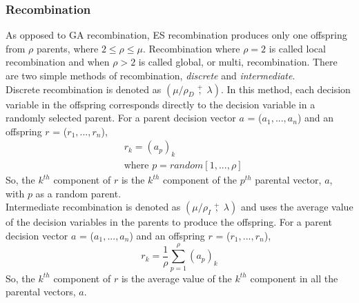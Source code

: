 \subsubsection{Recombination}
As opposed to GA recombination, ES recombination produces only one offspring from $\rho$ parents, where $2 \le \rho \le \mu$. Recombination where $\rho = 2$ is called local recombination and when $\rho > 2$ is called global\cite{4-es}, or multi\cite{es}, recombination. There are two simple methods of recombination, \emph{discrete} and \emph{intermediate}.
\\Discrete recombination is denoted as $(\mu/\rho_{D}\;\overset{+}{,}\;\lambda)$. In this method, each decision variable in the offspring corresponds directly to the decision variable in a randomly selected parent. For a parent decision vector $a$ = ($a_{1}, ..., a_{n}$) and an offspring $r$ = ($r_{1}, ..., r_{n}$),\cite{es}
\begin{equation}
  \begin{split}
    &r_{k} = (a_{p})_{k} \\
    &\text{where } p = random[1, ..., \rho]
  \end{split}
\end{equation} 
So, the $k^{th}$ component of $r$ is the $k^{th}$ component of the $p^{th}$ parental vector, $a$, with $p$ as a random parent.
\\Intermediate recombination is denoted as $(\mu/\rho_{I}\;\overset{+}{,}\;\lambda)$ and uses the average value of the decision variables in the parents to produce the offspring. For a parent decision vector $a$ = ($a_{1}, ..., a_{n}$) and an offspring $r$ = ($r_{1}, ..., r_{n}$),\cite{es}
\begin{equation}
  r_{k} = \frac{1}{\rho}\sum_{p=1}^{\rho}{(a_{p})_{k}}
\end{equation} 
So, the $k^{th}$ component of $r$ is the average value of the $k^{th}$ component in all the parental vectors, $a$.

